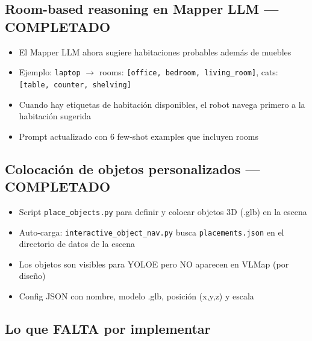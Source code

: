 \documentclass[11pt,a4paper]{article}
\begin{document}
\subsection{Room-based reasoning en Mapper LLM --- COMPLETADO}

\begin{itemize}[leftmargin=2cm]
    \item[\textcolor{done}{$\checkmark$}] El Mapper LLM ahora sugiere habitaciones probables además de muebles
    \item[\textcolor{done}{$\checkmark$}] Ejemplo: \texttt{laptop} $\rightarrow$ rooms: \texttt{[office, bedroom, living\_room]}, cats: \texttt{[table, counter, shelving]}
    \item[\textcolor{done}{$\checkmark$}] Cuando hay etiquetas de habitación disponibles, el robot navega primero a la habitación sugerida
    \item[\textcolor{done}{$\checkmark$}] Prompt actualizado con 6 few-shot examples que incluyen rooms
\end{itemize}

\subsection{Colocación de objetos personalizados --- COMPLETADO}

\begin{itemize}[leftmargin=2cm]
    \item[\textcolor{done}{$\checkmark$}] Script \texttt{place\_objects.py} para definir y colocar objetos 3D (.glb) en la escena
    \item[\textcolor{done}{$\checkmark$}] Auto-carga: \texttt{interactive\_object\_nav.py} busca \texttt{placements.json} en el directorio de datos de la escena
    \item[\textcolor{done}{$\checkmark$}] Los objetos son visibles para YOLOE pero NO aparecen en VLMap (por diseño)
    \item[\textcolor{done}{$\checkmark$}] Config JSON con nombre, modelo .glb, posición (x,y,z) y escala
\end{itemize}

\subsection{Lo que FALTA por implementar}
\end{document}
